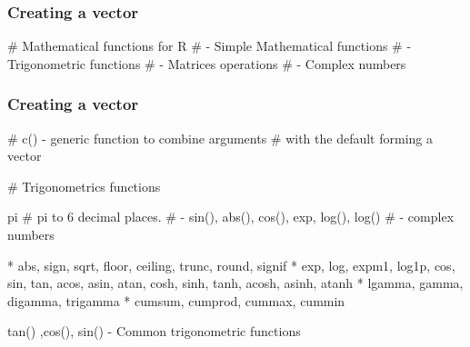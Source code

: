 \begin{frame}[fragile]
\frametitle{Creating a vector}
# Mathematical functions for R
# - Simple Mathematical functions
# - Trigonometric functions
# - Matrices operations
# - Complex numbers

\end{frame}
\begin{frame}[fragile]
\frametitle{Creating a vector}
# c() - generic function to combine arguments 
# with the default forming a vector

\end{frame}

\begin{frame}[fragile]# Trigonometrics functions

pi            #   pi to 6 decimal places.
# - sin(), abs(), cos(), exp, log(), log()
# - complex numbers

	* abs, sign, sqrt, floor, ceiling, trunc, round, signif
	* exp, log, expm1, log1p, cos, sin, tan, acos, asin, atan, cosh, sinh, tanh, acosh, asinh, atanh
	* lgamma, gamma, digamma, trigamma
	* cumsum, cumprod, cummax, cummin 


tan() ,cos(), sin()   - Common trigonometric functions



\end{frame}


